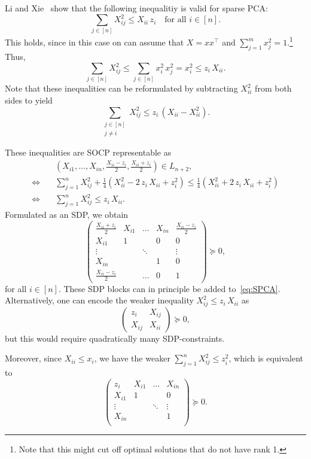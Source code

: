 \documentclass[10pt, a4paper]{article}
\newcommand{\T}{^{\top}}
\begin{document}
Li and Xie~\cite{LiX20} show that the following inequalitiy is valid for
sparse PCA:
\[
  \sum_{j \in [n]} X_{ij}^2 \leq X_{ii}\, z_i \quad\text{for all } i \in [n].
\]
This holds, since in this case on can assume that $X = x x\T$ and $\sum_{j=1}^m x_j^2 =
1$.\footnote{Note that this might cut off optimal solutions that do not
  have rank 1.} Thus,
\[
  \sum_{j \in [n]} X_{ij}^2 \leq \sum_{j \in [n]} x_i^2\, x_j^2 = x_i^2
  \leq z_i\, X_{ii}.
\]
Note that these inequalities can be reformulated by subtracting $X_{ii}^2$
from both sides to yield
\[
  \sum_{\substack{j \in [n]\\ j \neq i}} X_{ij}^2 \leq z_i\, (X_{ii} - X_{ii}^2).
\]


These inequalities are SOCP representable as
\begin{align*}
  & (X_{i1}, \dots, X_{in}, \tfrac{X_{ii} - z_i}{2}, \tfrac{X_{ii} + z_i}{2}) \in L_{n+2},\\
  \Leftrightarrow\quad & \sum_{j=1}^n X_{ij}^2 + \tfrac{1}{4}(X_{ii}^2 - 2\,
                    z_i\, X_{ii} + z_i^2) \leq \tfrac{1}{4}(X_{ii}^2 + 2\, z_i\, X_{ii} + z_i^2)\\
  \Leftrightarrow\quad & \sum_{j=1}^n X_{ij}^2 \leq z_i\, X_{ii}.
\end{align*}
Formulated as an SDP, we obtain
\[
  \begin{pmatrix}
    \tfrac{X_{ii} + z_i}{2} & X_{i1} & \dots & X_{in} & \tfrac{X_{ii} - z_i}{2}\\
    X_{i1} & 1 &  & 0 & 0\\
    \vdots & & \ddots & & \vdots\\
    X_{in} & &    & 1 & 0\\
    \tfrac{X_{ii} - z_i}{2} & & \dots & 0 & 1
  \end{pmatrix}
  \succeq 0,
\]
for all $i \in [n]$.  These SDP blocks can in principle be added
to~\eqref{eq:SPCA}. Alternatively, one can encode the weaker inequality
$X_{ij}^2 \leq z_i\, X_{ii}$ as
\[
  \begin{pmatrix}
    z_i & X_{ij}\\
    X_{ij} & X_{ii}
  \end{pmatrix}
  \succeq 0,
\]
but this would require quadratically many SDP-constraints.

Moreover, since $X_{ii} \leq x_i$, we have the weaker
$\sum_{j=1}^n X_{ij}^2 \leq z_i^2$, which is equivalent to
\[
  \begin{pmatrix}
    z_i & X_{i1} & \dots & X_{in} \\
    X_{i1} & 1 &  & 0 \\
    \vdots & & \ddots & \vdots \\
    X_{in} & &    & 1 \\
  \end{pmatrix}
  \succeq 0.
\]
\end{document}
